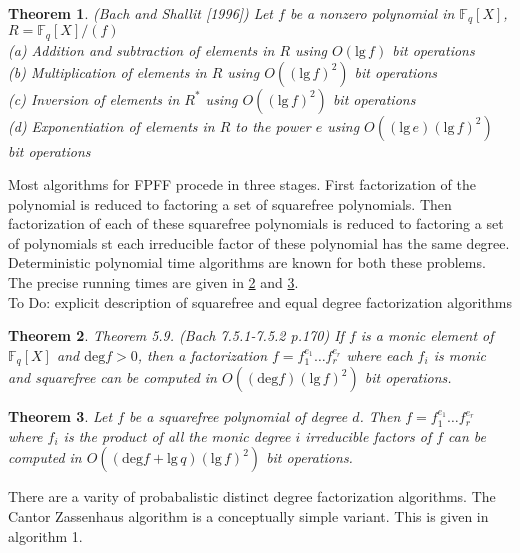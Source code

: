 \documentclass[a4paper]{article}
\newtheorem{thm}{Theorem}[section]
\def\Fq {{ \mathbb{F} _ {q} }}
\def\lg {{ \mathrm{lg \hspace{2pt}} }}
\def\deg {{ \mathrm{deg}}}
\begin{document}
\begin{thm} (Bach and Shallit [1996])
Let $f$ be a nonzero polynomial in $\Fq[X]$, $R =\Fq[X]/(f)$ \\
(a) Addition and subtraction of elements in $R$ using $O(\lg f)$ bit operations \\
(b) Multiplication of elements in $R$ using $O((\lg f)^2)$ bit operations \\
(c) Inversion of elements in $R^*$ using $O((\lg f)^2)$ bit operations \\
(d) Exponentiation of elements in $R$ to the power $e$ using $O((\lg e)(\lg f)^2)$ bit operations 
\end{thm}



Most algorithms for FPFF procede in three stages. First factorization of the polynomial is reduced to factoring a set of squarefree polynomials. Then factorization of each of these squarefree polynomials is reduced to factoring a set of polynomials st each irreducible factor of these polynomial has the same degree. Deterministic polynomial time algorithms are known for both these problems. The precise running times are given in \ref{runtimeSQF} and \ref{runtimeEqualDegFac}. \\

\noindent To Do: explicit description of squarefree and equal degree factorization algorithms

\begin{thm}
\label{runtimeSQF}
Theorem 5.9. (Bach 7.5.1-7.5.2 p.170) If $f$ is a monic element of $\Fq[X]$ and $\deg f > 0$, then a factorization $f = f_1^{e_1} \dots f_r^{e_r}$ where each $f_i$ is monic and squarefree can be computed in $O((\deg f)(\lg f)^2)$ bit operations.
\end{thm}

\begin{thm}
\label{runtimeEqualDegFac}
Let $f$ be a squarefree polynomial of degree $d$. Then $f = f_1^{e_1} \dots f_r^{e_r}$ where $f_i$ is the product of all the monic degree $i$ irreducible factors of $f$ can be computed in $O((\deg f + \lg q)(\lg f)^2)$ bit operations.
\end{thm}

\noindent There are a varity of probabalistic distinct degree factorization algorithms. The Cantor Zassenhaus algorithm is a conceptually simple variant. This is given in algorithm 1. 
\end{document}
